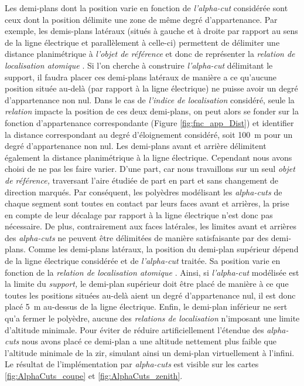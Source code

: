 Les demi-plans dont la position varie en fonction de
\emph{l'alpha-cut} considérée sont ceux dont la position délimite une
zone de même degré d'appartenance. Par exemple, les demis-plans
latéraux (\ie situés à gauche et à droite par rapport au sens de la
ligne électrique et parallèlement à celle-ci) permettent de délimiter
une distance planimétrique à \emph{l'objet de référence} et donc de
représenter la \emph{relation de localisation atomique}
. Si
l'on cherche à construire \emph{l'alpha-cut} délimitant le support, il
faudra placer ces demi-plans latéraux de manière a ce qu'aucune
position située au-delà (par rapport à la ligne électrique) ne puisse
avoir un degré d'appartenance non nul. Dans le cas de \emph{l'indice
  de localisation} considéré, seule la \emph{relation}
impacte la position de ces deux demi-plans, on peut alors se fonder
sur la fonction d'appartenance correspondante (Figure
\ref{fig:fnc_app_Dist}) et identifier la distance correspondant au
degré d'éloignement considéré, soit \SI{100}{\meter} pour un degré
d'appartenance non nul. Les demi-plans avant et arrière délimitent
également la distance planimétrique à la ligne électrique. Cependant
nous avons choisi de ne pas les faire varier. D'une part, car nous
travaillons sur un seul \emph{objet de référence,} traversant l'aire
étudiée de part en part et sans changement de direction marqués. Par
conséquent, les polyèdres modélisant les \emph{alpha-cuts} de chaque
segment sont toutes en contact par leurs faces avant et arrières, la
prise en compte de leur décalage par rapport à la ligne électrique
n'est donc pas nécessaire. De plus, contrairement aux faces latérales,
les limites avant et arrières des \emph{alpha-cuts} ne peuvent être
délimitées de manière satisfaisante par des demi-plans.
% 
Comme les demi-plans latéraux, la position du demi-plan supérieur
dépend de la ligne électrique considérée et de \emph{l'alpha-cut}
traitée. Sa position varie en fonction de la \emph{relation de
  localisation atomique}
. Ainsi,
si \emph{l'alpha-cut} modélisée est la limite du \emph{support,} le
demi-plan supérieur doit être placé de manière à ce que toutes les
positions situées au-delà aient un degré d'appartenance nul, il est
donc placé \SI{5}{\meter} au-dessus de la ligne électrique.  Enfin, le
demi-plan inférieur ne sert qu'a fermer le polyèdre, aucune des
\emph{relations de localisation} n'imposant une limite d'altitude
minimale. Pour éviter de réduire artificiellement l'étendue des
\emph{alpha-cuts} nous avons placé ce demi-plan a une altitude
nettement plus faible que l'altitude minimale de la \ac{zir}, simulant
ainsi un demi-plan virtuellement à l'infini. Le résultat de
l'implémentation par \emph{alpha-cuts} est visible sur les cartes
\ref{fig:AlphaCuts_coupe} et \ref{fig:AlphaCuts_zenith}.

